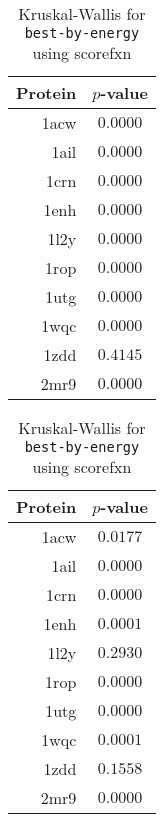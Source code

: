 \begin{table}
  \begin{minipage}{.5\linewidth}
  \centering
  \begin{tabular}{r|c}
  Protein & $p$-value \\ \hline \hline
  1acw & $\bm{0.0000}$ \\ \hline
  1ail & $\bm{0.0000}$ \\ \hline
  1crn & $\bm{0.0000}$ \\ \hline
  1enh & $\bm{0.0000}$ \\ \hline
  1l2y & $\bm{0.0000}$ \\ \hline
  1rop & $\bm{0.0000}$ \\ \hline
  1utg & $\bm{0.0000}$ \\ \hline
  1wqc & $\bm{0.0000}$ \\ \hline
  1zdd &     $0.4145$  \\ \hline
  2mr9 & $\bm{0.0000}$ \\ \hline
  \end{tabular}
  \caption{Kruskal-Wallis for \texttt{best-by-rmsd} using RMSD}
  \label{tab:kruskal-wallis-wilk-best-by-rmsd-RMSD}
  \end{minipage}
%
  \begin{minipage}{.5\linewidth}
  \centering
  \begin{tabular}{r|c}
  Protein & $p$-value \\ \hline \hline
  1acw & $\bm{0.0177}$ \\ \hline
  1ail & $\bm{0.0000}$ \\ \hline
  1crn & $\bm{0.0000}$ \\ \hline
  1enh & $\bm{0.0001}$ \\ \hline
  1l2y &     $0.2930$  \\ \hline
  1rop & $\bm{0.0000}$ \\ \hline
  1utg & $\bm{0.0000}$ \\ \hline
  1wqc & $\bm{0.0001}$ \\ \hline
  1zdd &     $0.1558$  \\ \hline
  2mr9 & $\bm{0.0000}$ \\ \hline
  \end{tabular}
  \caption{Kruskal-Wallis for \texttt{best-by-energy} using scorefxn}
  \label{tab:kruskal-wallis-wilk-best-by-energy-scorefxn}
  \end{minipage}
\end{table}